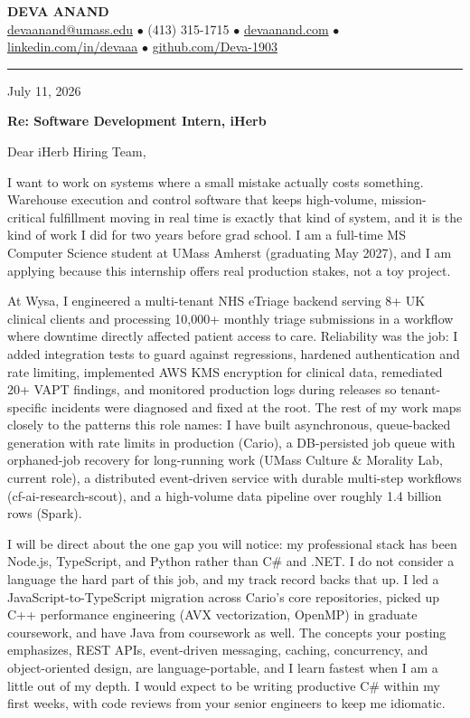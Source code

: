 \documentclass[letterpaper,11pt]{article}
\begin{document}
\begin{center}
    {\fontsize{18}{20}\selectfont\bfseries DEVA ANAND}\\ \vspace{3pt}
    {\small
    \href{mailto:devaanand@umass.edu}{devaanand@umass.edu}
    \enspace$\bullet$\enspace
    (413) 315-1715
    \enspace$\bullet$\enspace
    \href{https://devaanand.com}{devaanand.com}
    \enspace$\bullet$\enspace
    \href{https://linkedin.com/in/devaaa/}{linkedin.com/in/devaaa}
    \enspace$\bullet$\enspace
    \href{https://github.com/Deva-1903}{github.com/Deva-1903}}
\end{center}
\vspace{4pt}
\hrule
\vspace{14pt}

July 11, 2026

\textbf{Re: Software Development Intern, iHerb}

Dear iHerb Hiring Team,

I want to work on systems where a small mistake actually costs something. Warehouse execution and control software that keeps high-volume, mission-critical fulfillment moving in real time is exactly that kind of system, and it is the kind of work I did for two years before grad school. I am a full-time MS Computer Science student at UMass Amherst (graduating May 2027), and I am applying because this internship offers real production stakes, not a toy project.

At Wysa, I engineered a multi-tenant NHS eTriage backend serving 8+ UK clinical clients and processing 10,000+ monthly triage submissions in a workflow where downtime directly affected patient access to care. Reliability was the job: I added integration tests to guard against regressions, hardened authentication and rate limiting, implemented AWS KMS encryption for clinical data, remediated 20+ VAPT findings, and monitored production logs during releases so tenant-specific incidents were diagnosed and fixed at the root. The rest of my work maps closely to the patterns this role names: I have built asynchronous, queue-backed generation with rate limits in production (Cario), a DB-persisted job queue with orphaned-job recovery for long-running work (UMass Culture \& Morality Lab, current role), a distributed event-driven service with durable multi-step workflows (cf-ai-research-scout), and a high-volume data pipeline over roughly 1.4 billion rows (Spark).

I will be direct about the one gap you will notice: my professional stack has been Node.js, TypeScript, and Python rather than C\# and .NET. I do not consider a language the hard part of this job, and my track record backs that up. I led a JavaScript-to-TypeScript migration across Cario's core repositories, picked up C++ performance engineering (AVX vectorization, OpenMP) in graduate coursework, and have Java from coursework as well. The concepts your posting emphasizes, REST APIs, event-driven messaging, caching, concurrency, and object-oriented design, are language-portable, and I learn fastest when I am a little out of my depth. I would expect to be writing productive C\# within my first weeks, with code reviews from your senior engineers to keep me idiomatic.
\end{document}
